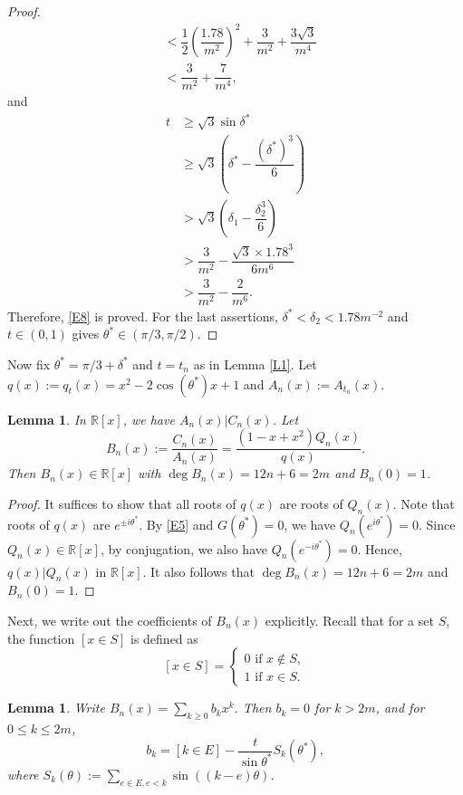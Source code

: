 \documentclass[a4paper,12pt,english,reqno]{amsart}
\newtheorem{lem}[thm]{Lemma}
\theoremstyle{definition}
\theoremstyle{remark}
\newcommand{\R}{{\mathbb R}}
\begin{document}
\begin{proof}
\[\begin{split}
&<\dfrac{1}{2}\left(\dfrac{1.78}{m^2}\right)^2+\dfrac{3}{m^2}+\dfrac{3\sqrt{3}}{m^4}\\
&<\dfrac{3}{m^2}+\dfrac{7}{m^4},\end{split}\]
and \[\begin{split}
t&\geq \sqrt{3}\sin\delta^*\\
&\geq \sqrt{3}\left(\delta^*-\dfrac{(\delta^*)^3}{6}\right)\\
&>\sqrt{3}\left(\delta_1-\dfrac{\delta_2^3}{6}\right)\\
&>\dfrac{3}{m^2}-\dfrac{\sqrt{3}\times 1.78^3}{6m^6}\\
&>\dfrac{3}{m^2}-\dfrac{2}{m^6}.
\end{split}\]
Therefore, \eqref{E8} is proved. For the last assertions, $\delta^*<\delta_2<1.78m^{-2}$ and $t\in(0,1)$ gives $\theta^*\in (\pi/3,\pi/2)$.
\end{proof}
Now fix $\theta^*=\pi/3+\delta^*$ and $t=t_n$ as in Lemma \ref{L1}. Let $q(x):=q_t(x)=x^2-2\cos(\theta^*)x+1$ and $A_n(x):=A_{t_n}(x)$.
\begin{lem}\label{L2} In $\R[x]$, we have $A_n(x)|C_n(x)$. Let \[B_n(x):=\dfrac{C_n(x)}{A_n(x)}=\dfrac{(1-x+x^2)Q_n(x)}{q(x)}.\]
Then $B_n(x)\in \R[x]$ with $\deg B_n(x)=12n+6=2m$ and $B_n(0)=1$.
\end{lem}
\begin{proof}
It suffices to show that all roots of $q(x)$ are roots of $Q_n(x)$. Note that roots of $q(x)$ are $e^{\pm i\theta^*}$. By \eqref{E5} and $G(\theta^*)=0$, we have $Q_n(e^{i\theta^*})=0$. Since $Q_n(x)\in \R[x]$, by conjugation, we also have $Q_n(e^{-i\theta^*})=0$. Hence, $q(x)|Q_n(x)$ in $\R[x]$. It also follows that  $\deg B_n(x)=12n+6=2m$ and $B_n(0)=1$.
\end{proof}
Next, we write out the coefficients of $B_n(x)$ explicitly. Recall that for a set $S$, the function $[x\in S]$ is defined as 
\[[x\in S]=\begin{cases}
    0\text{ if } x\not\in S,\\
    1 \text{ if } x\in S.
\end{cases}\]
\begin{lem}\label{L3}
Write $B_n(x)=\sum\limits_{k\geq 0}b_kx^k$. Then $b_k=0$ for $k>2m$, and for $0\leq k\leq 2m$,
\begin{equation}\label{E9}
b_k=[k\in E]-\dfrac{t}{\sin\theta^*}S_k(\theta^*),
\end{equation}
where $S_k(\theta):=\sum\limits_{e\in E,e<k}\sin\left((k-e)\theta\right)$.
\end{lem}
\end{document}
